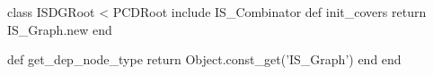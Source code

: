 \begin{rubyblock}
class ISDGRoot < PCDRoot
  include IS_Combinator
  def init_covers
    return IS_Graph.new
  end

  def get_dep_node_type
    return Object.const_get('IS_Graph')
  end
end
\end{rubyblock}
